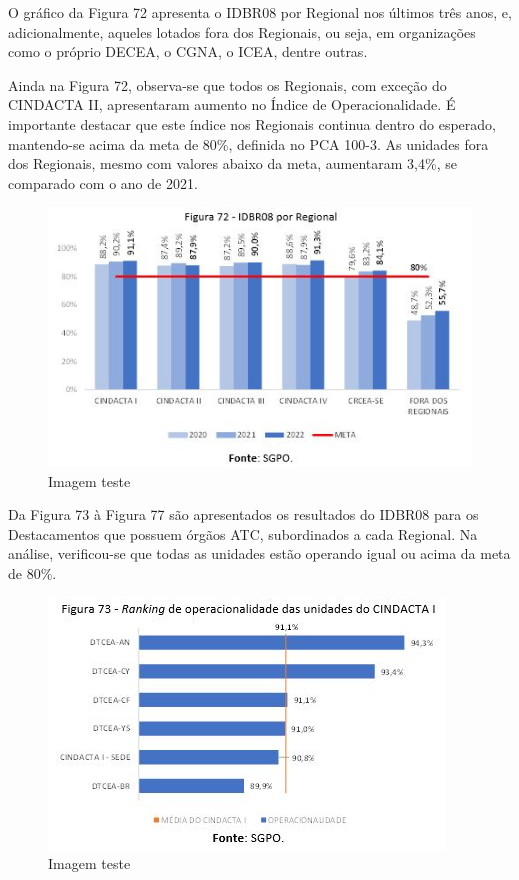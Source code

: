 \documentclass[
]{book}
\begin{document}
O gráfico da Figura 72 apresenta o IDBR08 por Regional nos últimos três anos, e, adicionalmente, aqueles lotados fora dos Regionais, ou seja, em organizações como o próprio DECEA, o CGNA, o ICEA, dentre outras.

Ainda na Figura 72, observa-se que todos os Regionais, com exceção do CINDACTA II, apresentaram aumento no Índice de Operacionalidade. É importante destacar que este índice nos Regionais continua dentro do esperado, mantendo-se acima da meta de 80\%, definida no PCA 100-3. As unidades fora dos Regionais, mesmo com valores abaixo da meta, aumentaram 3,4\%, se comparado com o ano de 2021.

\begin{figure}
\centering
\includegraphics{imagens/fig58.jpg}
\caption{Imagem teste}
\end{figure}

Da Figura 73 à Figura 77 são apresentados os resultados do IDBR08 para os Destacamentos que possuem órgãos ATC, subordinados a cada Regional. Na análise, verificou-se que todas as unidades estão operando igual ou acima da meta de 80\%.

\begin{figure}
\centering
\includegraphics{imagens/fig59.jpg}
\caption{Imagem teste}
\end{figure}
\end{document}
